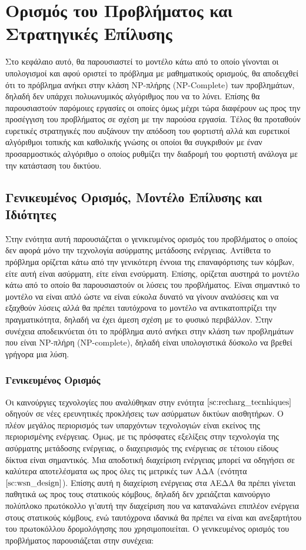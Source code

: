 

\chapter{Ορισμός του Προβλήματος και Στρατηγικές Επίλυσης} \label{ch:strategies_solution}
Στο κεφάλαιο αυτό, θα παρουσιαστεί το μοντέλο κάτω από το οποίο γίνονται οι υπολογισμοί και αφού οριστεί το πρόβλημα με μαθηματικούς ορισμούς, θα αποδειχθεί ότι το
πρόβλημα ανήκει στην κλάση NP-πλήρης (NP-Complete) των προβλημάτων, δηλαδή δεν υπάρχει πολυωνυμικός αλγόριθμος που να το λύνει. Επίσης θα παρουσιαστούν παρόμοιες
εργασίες οι οποίες όμως μέχρι τώρα διαφέρουν ως προς την προσέγγιση του προβλήματος σε σχέση με την παρούσα εργασία. Τέλος θα προταθούν ευρετικές στρατηγικές που
αυξάνουν την απόδοση του φορτιστή αλλά και ευρετικοί αλγόριθμοι τοπικής και καθολικής γνώσης οι οποίοι θα συγκριθούν με έναν προσαρμοστικός αλγόριθμο ο οποίος
ρυθμίζει την διαδρομή του φορτιστή ανάλογα με την κατάσταση του δικτύου.


\section{Γενικευμένος Ορισμός, Μοντέλο Επίλυσης και Ιδιότητες}
Στην ενότητα αυτή παρουσιάζεται ο γενικευμένος ορισμός του προβλήματος ο οποίος δεν αφορά μόνο την τεχνολογία ασύρματης μετάδοσης ενέργειας. Αντίθετα το πρόβλημα
ορίζεται κάτω από την γενικότερη έννοια της επαναφόρτισης των κόμβων, είτε αυτή είναι ασύρματη, είτε είναι ενσύρματη. Επίσης, ορίζεται αυστηρά το μοντέλο κάτω από το
οποίο θα παρουσιαστούν οι λύσεις του προβλήματος. Είναι σημαντικό το μοντέλο να είναι απλό ώστε να είναι εύκολα δυνατό να γίνουν αναλύσεις και να εξαχθούν λύσεις
αλλά θα πρέπει ταυτόχρονα το μοντέλο να αντικατοπτρίζει την πραγματικότητα, δηλαδή να έχει άμεση σχέση με το φυσικό περιβάλλον. Στην συνέχεια αποδεικνύεται ότι το
πρόβλημα αυτό ανήκει στην κλάση των προβλημάτων που είναι NP-πλήρη (NP-complete), δηλαδή είναι υπολογιστικά δύσκολο να βρεθεί γρήγορα μια λύση.

\subsection{Γενικευμένος Ορισμός}
Οι καινούργιες τεχνολογίες που αναλύθηκαν στην ενότητα $\ref{sc:recharg_tecnhiques}$ οδηγούν σε νέες ερευνητικές προκλήσεις των ασύρματων δικτύων αισθητήρων. Ο πλέον
μεγάλος περιορισμός των υπαρχόντων τεχνολογιών είναι εκείνος της περιορισμένης ενέργειας. Όμως, με τις πρόσφατες εξελίξεις στην τεχνολογία της ασύρματης μετάδοσης
ενέργειας, ο διαχειρισμός της ενέργειας σε τέτοιου είδους δίκτυα είναι σημαντικός. Μια αποδοτική διαχείριση ενέργειας μπορεί να οδηγήσει σε καλύτερα αποτελέσματα ως
προς όλες τις μετρικές των ΑΔΑ (ενότητα $\ref{sc:wsn_design}$). Επίσης αυτή η διαχείριση ενέργειας στα ΑΕΔΑ θα πρέπει γίνεται παθητικά ως προς τους στατικούς κόμβους,
δηλαδή δεν χρειάζεται καινούργιο πολύπλοκο πρωτόκολλο γι'αυτή την διαχείριση που να καταναλώνει επιπλέον ενέργεια στους στατικούς κόμβους, ενώ ταυτόχρονα ιδανικά θα
πρέπει να είναι και ανεξαρτήτου του πρωτοκόλλου δρομολόγησης που χρησιμοποιείται. Ο γενικευμένος ορισμός του προβλήματος παρουσιάζεται στην συνέχεια:

